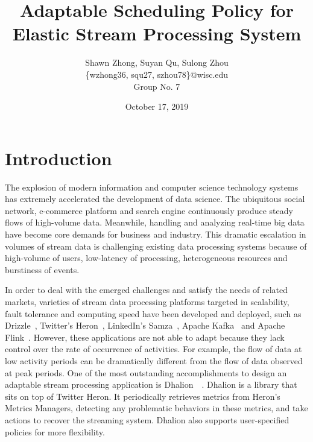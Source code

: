 \documentclass[pdftex,twocolumn,10pt,letterpaper]{article}
\begin{document}
\title{Adaptable Scheduling Policy for Elastic Stream Processing System }
\author{
    Shawn Zhong, Suyan Qu, Sulong Zhou \\
    \{wzhong36, squ27, szhou78\}@wisc.edu\\
    Group No. 7
}
\date{October 17, 2019}


\maketitle

\section{Introduction}

The explosion of modern information and computer science technology systems has extremely accelerated the development of data science. The ubiquitous social network, e-commerce platform and search engine continuously produce steady flows of high-volume data. Meanwhile, handling and analyzing real-time big data have become core demands for business and industry. This dramatic escalation in volumes of stream data is challenging existing data processing systems because of high-volume of users, low-latency of processing, heterogeneous resources and burstiness of events.  

In order to deal with the emerged challenges and satisfy the needs of related markets, varieties of stream data processing platforms targeted in scalability, fault tolerance and computing speed have been developed and deployed, such as Drizzle~\cite{Venkataraman:2017:DFA:3132747.3132750},  Twitter’s Heron~\cite{Kulkarni:2015:THS:2723372.2742788}, LinkedIn’s Samza~\cite{Noghabi:2017:SSS:3137765.3137770}, Apache Kafka~\cite{kreps2011kafka} and Apache Flink~\cite{Carbone2015ApacheFS}. However, these applications are not able to adapt because they lack control over the rate of occurrence of activities. For example, the flow of data at low activity periods can be dramatically different from the flow of data observed at peak periods. One of the most outstanding accomplishments to design an adaptable stream processing application is Dhalion~\cite{Agrawal:2018:DAA:3229863.3275594}~\cite{Floratou:2017:DSS:3137765.3137786}. Dhalion is a library that sits on top of Twitter Heron. It periodically retrieves metrics from Heron's Metrics Managers, detecting any problematic behaviors in these metrics, and take actions to recover the streaming system. Dhalion also supports user-specified policies for more flexibility. 
\end{document}
